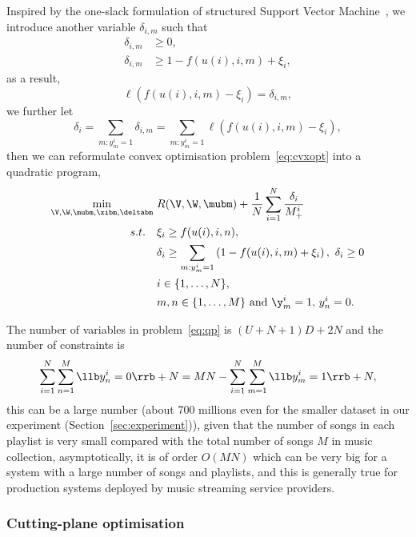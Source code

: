 Inspired by the one-slack formulation of structured Support Vector Machine~\cite{joachims2009cutting}, 
we introduce another variable $\delta_{i,m}$ such that
\begin{equation*}
\begin{aligned}
\delta_{i,m} & \ge 0, \\
\delta_{i,m} & \ge 1 - f( u(i), i, m) + \xi_i, 
\end{aligned}
\end{equation*}
as a result,
\begin{equation*}
\ell \left( f(u(i), i, m) - \xi_i \right) = \delta_{i,m},
\end{equation*}
we further let
\begin{equation*}
\delta_i = \sum_{m: y_m^i = 1} \delta_{i,m} = \sum_{m: y_m^i = 1} \ell \left( f(u(i), i, m) - \xi_i \right),
\end{equation*}
then we can reformulate convex optimisation problem~\ref{eq:cvxopt} into a quadratic program,
\begin{equation}
\label{eq:qp}
\begin{aligned}
\min_{\V, \W, \mubm, \xibm, \deltabm} \ & R(\V, \W, \mubm) + \frac{1}{N} \sum_{i=1}^N \frac{\delta_i}{M_+^i} \\
s.t. \quad 
& \xi_i \ge f(u(i), i, n), \\
& \delta_i \ge \sum_{m: y_m^i = 1} \left( 1 - f( u(i), i, m) + \xi_i \right), \ \delta_i \ge 0 \\
& i \in \{1,\dots,N\}, \\
& m, n \in \{1,\dots,M\} \ \mathrm{and} \ \y_m^i = 1, \,  y_n^i = 0. 
\end{aligned}
\end{equation}

The number of variables in problem~\ref{eq:qp} is $(U + N + 1) D + 2N$ and the number of constraints is
$$
\sum_{i=1}^N \sum_{n=1}^M \llb y_n^i = 0 \rrb + N = MN - \sum_{i=1}^N \sum_{m=1}^M \llb y_m^i = 1 \rrb + N,
$$
%
this can be a large number (\eg about 700 millions even for the smaller dataset in our experiment (Section~\ref{sec:experiment})),
given that the number of songs in each playlist is very small compared with the total number of songs $M$ in music collection,
asymptotically, it is of order $O(MN)$ which can be very big for a system with a large number of songs and playlists,
and this is generally true for production systems deployed by music streaming service providers.


\subsubsection{Cutting-plane optimisation}

